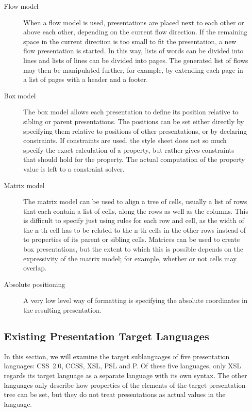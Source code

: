 \begin{description}
\item[Flow model]
When a flow model is used, presentations are placed next to each other or above each other, depending on the current flow direction. If the remaining space in the current direction is too small to fit the presentation, a new flow presentation is started. In this way, lists of words can be divided into lines and lists of lines can be divided into pages. The generated list of flows may then be manipulated further, for example, by extending each page in a list of pages with a header and a footer.
\item[Box model]
The box model allows each presentation to define its position relative to sibling or parent presentations. The positions can be set either directly by specifying them relative to positions of other presentations, or by declaring constraints. If constraints are used, the style sheet does not so much specify the exact calculation of a property, but rather gives constraints that should hold for the property. The actual computation of the property value is left to a constraint solver. 
\item[Matrix model]
The matrix model can be used to align a tree of cells, usually a list of rows that each contain a list of cells, along the rows as well as the columns. This is difficult to specify just using rules for each row and cell, as the width of the n-th cell has to be related to the n-th cells in the other rows instead of to properties of its parent or sibling cells. Matrices can be used to create box presentations, but the extent to which this is possible depends on the expressivity of the matrix model; for example, whether or not cells may overlap.
\item[Absolute positioning]
A very low level way of formatting is specifying the absolute coordinates in the resulting presentation.
\end{description}


%																
\subsection{Existing Presentation Target Languages} \label{existingtarget}

In this section, we will examine the target sublanguages of five presentation languages: CSS~2.0, CCSS, XSL, PSL and P. Of these five languages, only XSL regards its target language as a separate language with its own syntax. The other languages only describe how properties of the elements of the target presentation tree can be set, but they do not treat presentations as actual values in the language.

